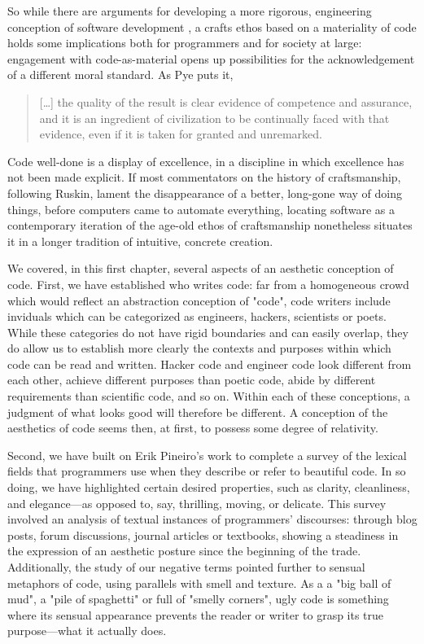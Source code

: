 So while there are arguments for developing a more rigorous, engineering conception of software development \citep{ensmenger_computer_2012}, a crafts ethos based on a materiality of code holds some implications both for programmers and for society at large: engagement with code-as-material opens up possibilities for the acknowledgement of a different moral standard. As Pye puts it,

\begin{quote}
  [\dots] the quality of the result is clear evidence of competence and assurance, and it is an ingredient of civilization to be continually faced with that evidence, even if it is taken for granted and unremarked. \citep{pye_nature_2008}
\end{quote}

Code well-done is a display of excellence, in a discipline in which excellence has not been made explicit. If most commentators on the history of craftsmanship, following Ruskin, lament the disappearance of a better, long-gone way of doing things, before computers came to automate everything, locating software as a contemporary iteration of the age-old ethos of craftsmanship nonetheless situates it in a longer tradition of intuitive, concrete creation.

\spacer

We covered, in this first chapter, several aspects of an aesthetic conception of code. First, we have established who writes code: far from a homogeneous crowd which would reflect an abstraction conception of "code", code writers include inviduals which can be categorized as engineers, hackers, scientists or poets. While these categories do not have rigid boundaries and can easily overlap, they do allow us to establish more clearly the contexts and purposes within which code can be read and written. Hacker code and engineer code look different from each other, achieve different purposes than poetic code, abide by different requirements than scientific code, and so on. Within each of these conceptions, a judgment of what looks good will therefore be different. A conception of the aesthetics of code seems then, at first, to possess some degree of relativity.

Second, we have built on Erik Pineiro's work to complete a survey of the lexical fields that programmers use when they describe or refer to beautiful code. In so doing, we have highlighted certain desired properties, such as clarity, cleanliness, and elegance—as opposed to, say, thrilling, moving, or delicate. This survey involved an analysis of textual instances of programmers' discourses: through blog posts, forum discussions, journal articles or textbooks, showing a steadiness in the expression of an aesthetic posture since the beginning of the trade. Additionally, the study of our negative terms pointed further to sensual metaphors of code, using parallels with smell and texture. As a a "big ball of mud", a "pile of spaghetti" or full of "smelly corners", ugly code is something where its sensual appearance prevents the reader or writer to grasp its true purpose—what it actually does.

